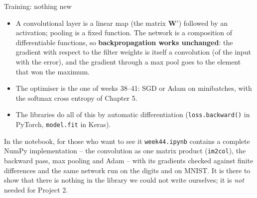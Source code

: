 \documentclass[10pt,aspectratio=169]{beamer}
\begin{document}
\begin{frame}{Training: nothing new}
\small
\begin{itemize}
  \item A convolutional layer is a linear map (the matrix $\bm{W}'$) followed
        by an activation; pooling is a fixed function.  The network is a
        composition of differentiable functions, so \textbf{backpropagation
        works unchanged}: the gradient with respect to the filter weights is
        itself a convolution (of the input with the error), and the gradient
        through a max pool goes to the element that won the maximum.
  \item The optimiser is the one of weeks 38--41: SGD or Adam on
        minibatches, with the softmax cross entropy of Chapter 5.
  \item The libraries do all of this by automatic differentiation
        (\texttt{loss.backward()} in PyTorch, \texttt{model.fit} in Keras).
\end{itemize}
\begin{block}{In the notebook, for those who want to see it}
\texttt{week44.ipynb} contains a complete NumPy implementation -- the
convolution as one matrix product (\texttt{im2col}), the backward pass,
max pooling and Adam -- with its gradients checked against finite
differences and the same network run on the digits and on MNIST.  It is
there to show that there is nothing in the library we could not write
ourselves; it is \emph{not} needed for Project 2.
\end{block}
\end{frame}
\end{document}
